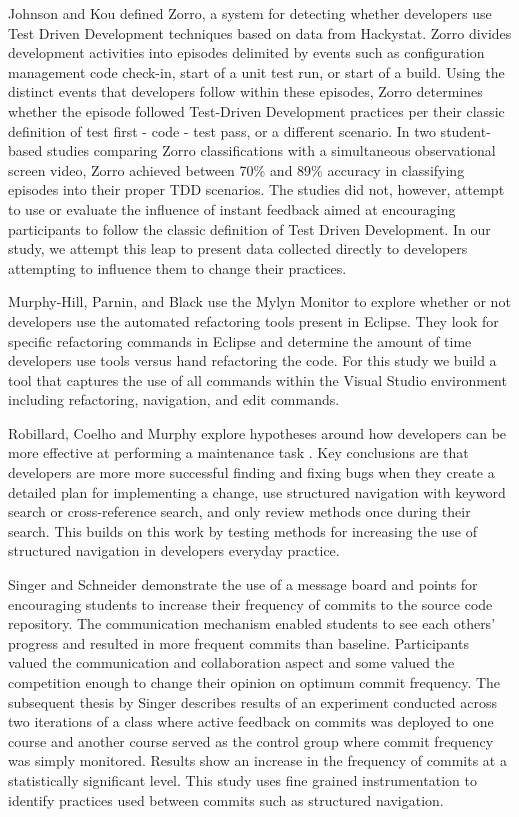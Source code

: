 \documentclass{sig-alternate}
\begin{document}
Johnson and Kou defined Zorro\cite{V:Johnson2007Automated}, a system for detecting whether developers use Test Driven Development techniques based on data from Hackystat.  Zorro divides development activities into episodes delimited by events such as configuration management code check-in, start of a unit test run, or start of a build.  Using the distinct events that developers follow within these episodes, Zorro determines whether the episode followed Test-Driven Development practices per their classic definition of test first - code - test pass, or a different scenario.  In two student-based studies comparing Zorro classifications with a simultaneous observational screen video, Zorro achieved between 70\% \cite{Kou2010Operational} and 89\% \cite{V:Johnson2007Automated} accuracy in classifying episodes into their proper TDD scenarios.  The studies did not, however, attempt to use or evaluate the influence of instant feedback aimed at encouraging participants to follow the classic definition of Test Driven Development.  In our study, we attempt this leap to present data collected directly to developers attempting to influence them to change their practices.

Murphy-Hill, Parnin, and Black \cite{V:MurphyHill2012How} use the Mylyn Monitor to explore whether or not developers use the automated refactoring tools present in Eclipse.  They look for specific refactoring commands in Eclipse and determine the amount of time developers use tools versus hand refactoring the code.  For this study we build a tool that captures the use of all commands within the Visual Studio environment including refactoring, navigation, and edit commands.

Robillard, Coelho and Murphy explore hypotheses around how developers can be more effective at performing a maintenance task \cite{wbsnipes:Robillard2004How}.  Key conclusions are that developers are more more successful finding and fixing bugs when they create a detailed plan for implementing a change, use structured navigation with keyword search or cross-reference search, and only review methods once during their search.  This builds on this work by testing methods for increasing the use of structured navigation in developers everyday practice.

Singer and Schneider demonstrate the use of a message board and points for encouraging students to increase their frequency of commits to the source code repository.\cite{Singer2012It}  The communication mechanism enabled students to see each others' progress and resulted in more frequent commits than baseline.  Participants valued the communication and collaboration aspect and some valued the competition enough to change their opinion on optimum commit frequency.  The subsequent thesis by Singer \cite{Singer2013a} describes results of an experiment conducted across two iterations of a class where active feedback on commits was deployed to one course and another course served as the control group where commit frequency was simply monitored.  Results show an increase in the frequency of commits at a statistically significant level.  This study uses fine grained instrumentation to identify practices used between commits such as structured navigation.
\end{document}
